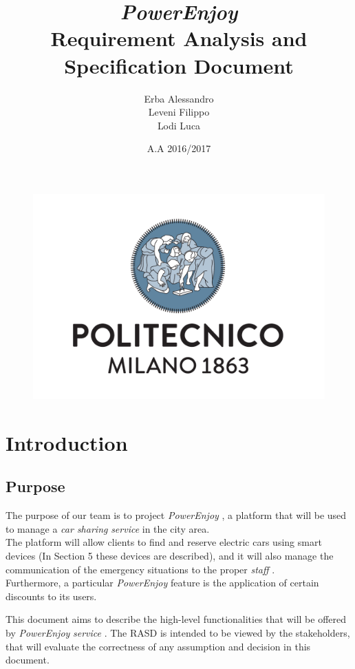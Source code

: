 \documentclass[english]{article}
\newcommand{\carsharing}{\textit {car sharing }}
\newcommand{\powerenjoy}{\textit{PowerEnjoy }}
\newcommand{\staff}{\textit{staff }}
\newcommand{\service}{\textit{service }}
\begin{document}
\begin{figure}
	\centering
	\includegraphics[scale=0.5]{logo.pdf} 
\end{figure}


\title{\powerenjoy\\
 Requirement Analysis and Specification Document\\
}

\date{A.A 2016/2017}

\author{Erba Alessandro\\
 Leveni Filippo\\
 Lodi Luca}

\maketitle
\pagebreak{}

\tableofcontents{} \pagebreak{}

\section{Introduction}
	\subsection{Purpose}
	
		The purpose of our team is to project \powerenjoy, a platform that will be used to manage a \carsharing \service  in the city area.\\
 		The platform will allow clients to find and reserve electric cars using smart devices (In Section 5 these devices are described), and it will also manage the communication of the emergency situations to the proper \staff.\\
  		Furthermore, a particular \powerenjoy feature is the application of certain discounts to its users.
  		\par This document aims to describe the high-level functionalities that will be offered by \powerenjoy \service. The RASD is intended to be viewed by the stakeholders, that will evaluate the correctness of any assumption and decision in this document.
  
\end{document}
